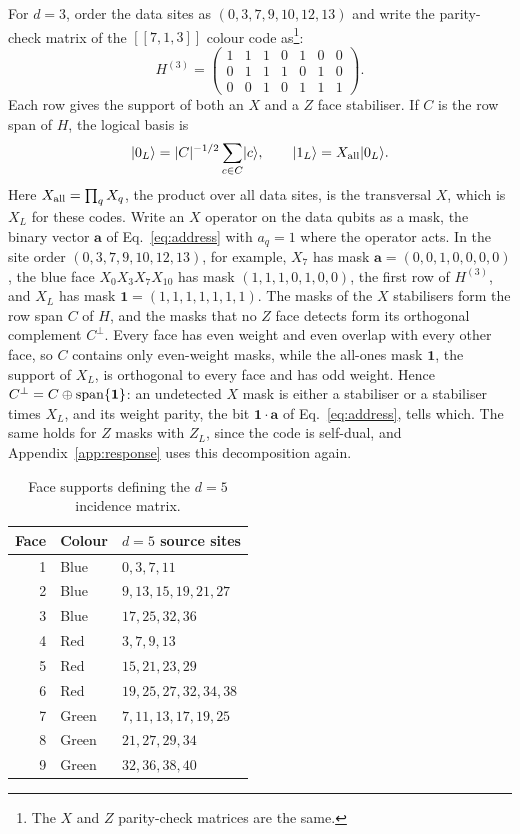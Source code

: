For $d=3$, order the data sites as $(0,3,7,9,10,12,13)$ and write the parity-check matrix of the $[[7,1,3]]$ colour code as\footnote{The $X$ and $Z$ parity-check matrices are the same.}:
\begin{equation}
 H^{(3)}=\begin{pmatrix}
 1&1&1&0&1&0&0\\
 0&1&1&1&0&1&0\\
 0&0&1&0&1&1&1
 \end{pmatrix}.
 \label{eq:H3}
\end{equation}
Each row gives the support of both an $X$ and a $Z$ face stabiliser.
If $C$ is the row span of $H$, the logical basis is
\begin{equation}
 \lvert0_L\rangle=|C|^{-1/2}\sum_{c\in C}\lvert c\rangle,\qquad
 \lvert1_L\rangle=X_{\rm all}\lvert0_L\rangle.
 \label{eq:codebasis}
\end{equation}
Here $X_{\rm all}=\prod_{q}X_q$, the product over all data sites, is the transversal $X$, which is $X_L$ for these codes.
Write an $X$ operator on the data qubits as a mask, the binary vector $\boldsymbol a$ of Eq.~\eqref{eq:address} with $a_q=1$ where the operator acts. In the site order $(0,3,7,9,10,12,13)$, for example, $X_7$ has mask $\boldsymbol a=(0,0,1,0,0,0,0)$, the blue face $X_0X_3X_7X_{10}$ has mask $(1,1,1,0,1,0,0)$, the first row of $H^{(3)}$, and $X_L$ has mask $\boldsymbol1=(1,1,1,1,1,1,1)$. The masks of the $X$ stabilisers form the row span $C$ of $H$, and the masks that no $Z$ face detects form its orthogonal complement $C^\perp$. Every face has even weight and even overlap with every other face, so $C$ contains only even-weight masks, while the all-ones mask $\boldsymbol1$, the support of $X_L$, is orthogonal to every face and has odd weight. Hence $C^\perp=C\oplus\operatorname{span}\{\boldsymbol1\}$: an undetected $X$ mask is either a stabiliser or a stabiliser times $X_L$, and its weight parity, the bit $\boldsymbol1\cdot\boldsymbol a$ of Eq.~\eqref{eq:address}, tells which. The same holds for $Z$ masks with $Z_L$, since the code is self-dual, and Appendix~\ref{app:response} uses this decomposition again.

\begin{table}[htbp]\centering
\captionsetup{position=above,skip=4pt}
\caption{Face supports defining the $d=5$ incidence matrix.}
\label{tab:faces}
\begin{tabular}{rll}\toprule
Face & Colour & $d=5$ source sites\\\midrule
1 & Blue & $0,3,7,11$\\
2 & Blue & $9,13,15,19,21,27$\\
3 & Blue & $17,25,32,36$\\
4 & Red & $3,7,9,13$\\
5 & Red & $15,21,23,29$\\
6 & Red & $19,25,27,32,34,38$\\
7 & Green & $7,11,13,17,19,25$\\
8 & Green & $21,27,29,34$\\
9 & Green & $32,36,38,40$\\\bottomrule
\end{tabular}
\end{table}

